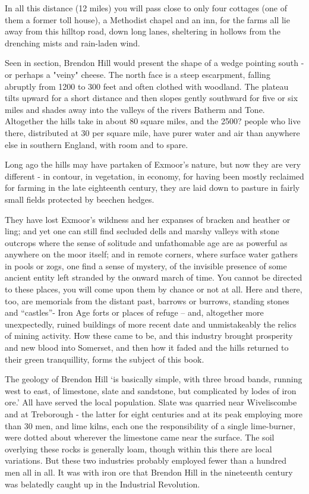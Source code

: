 \documentclass[11pt]{book}
\begin{document}
In all this distance (12 miles) you will pass close to only four cottages (one of them a former toll house), a Methodist chapel and an inn, for the farms all lie away from this hilltop  road,  down long lanes, sheltering in hollows from the drenching  mists and rain-laden wind.

Seen in section, Brendon Hill would present the shape of a wedge pointing south - or perhaps a "veiny" cheese. The north face is a steep escarpment, falling abruptly from 1200 to 300 feet and often clothed with woodland. The plateau tilts upward for a short distance and then slopes gently southward for five or six miles and shades away into the valleys of the rivers Batherm and Tone. Altogether the hills take in about 80 square miles, and the 2500? people who live there, distributed at  30  per square mile, have purer water and air than anywhere else in southern England, with  room and to spare. 

Long ago  the hills may have partaken of Exmoor's nature, but now they are very different - in contour, in vegetation, in economy, for having been mostly reclaimed for farming in the late eighteenth century, they are  laid down to pasture in fairly small fields protected by beechen hedges.

They have lost Exmoor’s wildness and her expanses of bracken and heather or ling; and yet one can still find secluded dells and marshy valleys with stone outcrops where the sense of solitude and unfathomable age are as powerful as anywhere on the moor itself; and in remote corners, where surface water gathers in pools or zogs, one find a sense of mystery, of the invisible presence of some ancient entity left stranded by the onward march of time. You cannot be directed to these places, you will come upon them by chance or not at all. Here and there, too, are memorials from the distant past, barrows or burrows, standing stones and “castles”- Iron Age forts or places of refuge – and, altogether more unexpectedly, ruined buildings of more recent date and unmistakeably the relics of mining activity. How these came to be, and this industry brought prosperity and new blood into Somerset, and then how it faded and the hills returned to their green tranquillity, forms the subject of this book.	             

The geology of Brendon Hill ‘is basically simple, with three broad bands, running west to east, of limestone, slate and sandstone, but complicated by lodes of iron ore.’ All have served the local population.   Slate was quarried near Wiveliscombe and at Treborough - the latter for eight centuries and at its peak employing more than 30 men, and lime kilns, each one the responsibility of a single lime-burner,  were dotted about  wherever the limestone came near the surface. The soil overlying these rocks is generally loam, though within this there are local variations.  But these two industries probably employed fewer than a hundred men all in all. It was with iron ore that   Brendon Hill in the nineteenth century was belatedly caught up in the Industrial Revolution.                                  
\end{document}
